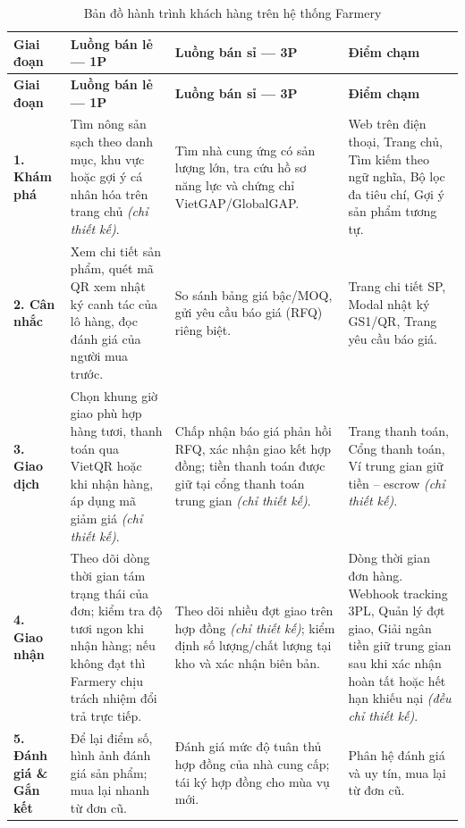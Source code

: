 \begingroup
\tblsetup\tblzebra
\begin{longtable}{L{2.15cm} L{3.77cm} L{3.77cm} L{4.85cm}}
\caption{Bản đồ hành trình khách hàng trên hệ thống Farmery}
\label{tab:customer-journey} \\
\toprule
{}
\textbf{Giai đoạn} & \textbf{Luồng bán lẻ --- 1P} & \textbf{Luồng bán sỉ --- 3P} & \textbf{Điểm chạm} \\
\midrule
\endfirsthead
\toprule
{}
\textbf{Giai đoạn} & \textbf{Luồng bán lẻ --- 1P} & \textbf{Luồng bán sỉ --- 3P} & \textbf{Điểm chạm} \\
\midrule
\endhead
\bottomrule
\endfoot
\textbf{1. Khám phá} &
Tìm nông sản sạch theo danh mục, khu vực hoặc gợi ý cá nhân hóa trên trang chủ \emph{(chỉ thiết kế)}. &
Tìm nhà cung ứng có sản lượng lớn, tra cứu hồ sơ năng lực và chứng chỉ VietGAP/GlobalGAP. &
Web trên điện thoại, Trang chủ, Tìm kiếm theo ngữ nghĩa, Bộ lọc đa tiêu chí, Gợi ý sản phẩm tương tự.\\
\textbf{2. Cân nhắc} &
Xem chi tiết sản phẩm, quét mã QR xem nhật ký canh tác của lô hàng, đọc đánh giá của người mua trước. &
So sánh bảng giá bậc/MOQ, gửi yêu cầu báo giá (RFQ) riêng biệt. &
Trang chi tiết SP, Modal nhật ký GS1/QR, Trang yêu cầu báo giá.\\
\textbf{3. Giao dịch} &
Chọn khung giờ giao phù hợp hàng tươi, thanh toán qua VietQR hoặc khi nhận hàng, áp dụng mã giảm giá \emph{(chỉ thiết kế)}. &
Chấp nhận báo giá phản hồi RFQ, xác nhận giao kết hợp đồng; tiền thanh toán được giữ tại cổng thanh toán trung gian \emph{(chỉ thiết kế)}. &
Trang thanh toán, Cổng thanh toán, Ví trung gian giữ tiền -- escrow \emph{(chỉ thiết kế)}.\\
\textbf{4. Giao nhận} &
Theo dõi dòng thời gian tám trạng thái của đơn; kiểm tra độ tươi ngon khi nhận hàng; nếu không đạt thì Farmery chịu trách nhiệm đổi trả trực tiếp. &
Theo dõi nhiều đợt giao trên hợp đồng \emph{(chỉ thiết kế)}; kiểm định số lượng/chất lượng tại kho và xác nhận biên bản. &
Dòng thời gian đơn hàng. Webhook tracking 3PL, Quản lý đợt giao, Giải ngân tiền giữ trung gian sau khi xác nhận hoàn tất hoặc hết hạn khiếu nại \emph{(đều chỉ thiết kế)}.\\
\textbf{5. Đánh giá \& Gắn kết} &
Để lại điểm số, hình ảnh đánh giá sản phẩm; mua lại nhanh từ đơn cũ. &
Đánh giá mức độ tuân thủ hợp đồng của nhà cung cấp; tái ký hợp đồng cho mùa vụ mới. &
Phân hệ đánh giá và uy tín, mua lại từ đơn cũ.\\
\end{longtable}
\endgroup

